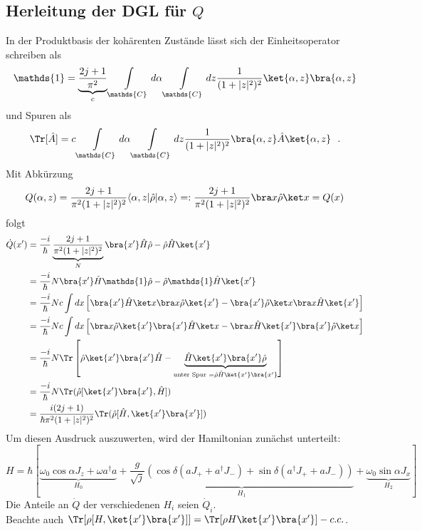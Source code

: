 \subsection{Herleitung der DGL für $Q$}
In der Produktbasis der kohärenten Zustände lässt sich der Einheitsoperator schreiben als
\begin{align*}
  \mathds{1} = \underbrace{\frac{2j+1}{\pi^2}}_{c} \int\limits_\mathds{C} d\alpha \int\limits_\mathds{C} dz \frac{1}{(1+|z|^2)^{2}} \ket {\alpha,z} \bra {\alpha,z}
\end{align*}
und Spuren als
\begin{align*}
  \Tr[\hat A] = c \int\limits_\mathds{C} d\alpha \int\limits_\mathds{C} dz \frac{1}{(1+|z|^2)^{2}} \bra {\alpha,z} \hat A \ket {\alpha,z} ~~.
\end{align*}
Mit Abkürzung
\begin{equation*}
  Q(\alpha,z) = \frac{2j+1}{\pi^2(1+|z|^2)^2} \langle\alpha,z|\hat{\rho}|\alpha,z\rangle =:\frac{2j+1}{\pi^2(1+|z|^2)^2} \bra x \hat \rho \ket x = Q(x)
\end{equation*}
folgt
\begin{align*}
  \dot Q(x') &= \frac{-i}{\hbar}\underbrace{\frac{2j+1}{\pi^2(1+|z|^2)^2}}_{N} \bra{x'} \hat H \hat \rho - \hat \rho \hat H\ket {x'}\\
  &= \frac{-i}{\hbar}N \bra{x'} \hat H \mathds{1} \hat \rho - \hat \rho \mathds{1} \hat H \ket {x'}\\
  &= \frac{-i}{\hbar}Nc \int dx \left[ \bra{x'} \hat  H \ket x \bra x \hat \rho \ket{x'} - \bra{x'} \hat \rho \ket x \bra x \hat H \ket{x'} \right]\\
  &= \frac{-i}{\hbar}Nc \int dx \left[ \bra x \hat \rho \ket{x'} \bra{x'} \hat  H \ket x - \bra x \hat H \ket{x'} \bra{x'} \hat \rho \ket x \right]\\
  &= \frac{-i}{\hbar}N \Tr\left[ \hat \rho \ket{x'} \bra{x'} \hat H - \underbrace{\hat H \ket{x'} \bra{x'} \hat \rho}_{\text{unter Spur }= \hat \rho\hat H \ket{x'} \bra{x'}} \right]\\
  &= \frac{-i}{\hbar}N \Tr (\hat \rho [\ket{x'} \bra{x'}, \hat H])\\
  &= \frac{i(2j+1)}{\hbar\pi^2(1+|z|^2)^2}\Tr (\hat \rho [\hat H,\ket{x'} \bra{x'}])
\end{align*}
Um diesen Ausdruck auszuwerten, wird der Hamiltonian zunächst unterteilt:
\begin{equation*}
  H= \hbar\left[ \underbrace{\omega_0 \cos\alpha J_z + \omega a^\dagger a}_{H_0} + \underbrace{\frac{g}{\sqrt{j}} \left(\cos\delta(aJ_+ + a^\dagger J_-) + \sin\delta (a^\dagger J_+ + aJ_-)\right)}_{H_1} + \underbrace {\omega_0 \sin\alpha J_x}_{H_2}\right]
\end{equation*}
Die Anteile an $\dot Q$ der verschiedenen $H_i$ seien $\dot Q_i$.\\
Beachte auch $\Tr[\rho [H,\ket{x'} \bra{x'}]] = \Tr[\rho H \ket{x'} \bra{x'}] - c.c.$. 

